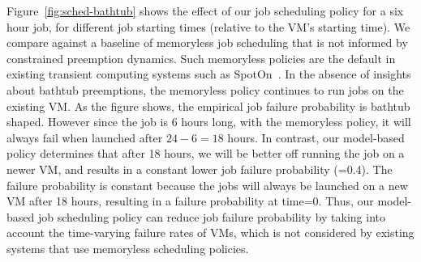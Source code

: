 Figure~\ref{fig:sched-bathtub} shows the effect of our job scheduling policy for a six hour job, for different job starting times (relative to the VM's starting time). 
We compare against a baseline of memoryless job scheduling that is not informed by constrained preemption dynamics.
Such memoryless policies are the default in existing transient computing systems such as SpotOn~\cite{spoton}. 
In the absence of insights about bathtub preemptions, the memoryless policy continues to run jobs on the existing VM. 
As the figure shows, the empirical job failure probability is bathtub shaped. 
However since the job is 6 hours long, with the memoryless policy, it will always fail when launched after $24-6=18$ hours.
In contrast, our model-based policy determines that after 18 hours, we will be better off running the job on a newer VM, and results in a constant lower job failure probability (=0.4). The failure probability is constant because the jobs will always be launched on a new VM after 18 hours, resulting in a failure probability at time=0. 
Thus, our model-based job scheduling policy can reduce job failure probability by taking into account the time-varying failure rates of VMs, which is not considered by existing systems that use memoryless scheduling policies. 

